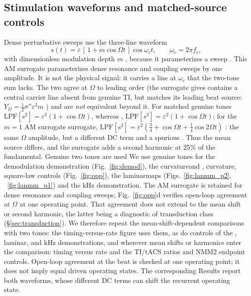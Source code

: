 \documentclass[11pt,a4paper]{article}
\newcommand{\Sig}{\sigma}
\newcommand{\half}{\tfrac{1}{2}}
\providecommand{\DIFaddtex}[1]{{\protect\color{blue} \sf #1}} %
\providecommand{\DIFdeltex}[1]{{\protect\color{red} \scriptsize #1}} %
\providecommand{\DIFaddbegin}{} %
\providecommand{\DIFaddend}{} %
\providecommand{\DIFdelbegin}{} %
\providecommand{\DIFdelend}{} %
\providecommand{\DIFadd}[1]{\texorpdfstring{\DIFaddtex{#1}}{#1}} %
\providecommand{\DIFdel}[1]{\texorpdfstring{\DIFdeltex{#1}}{}} %
\begin{document}
\DIFaddend \subsection{Stimulation waveforms and matched-source controls}\label{sec:waveforms}
Dense perturbative sweeps use the
three-line waveform
\begin{equation}
s(t)=\varepsilon\,[\,1+m\cos\Omega t\,]\cos\omega_c t,\qquad \omega_c=2\pi f_c ,
\label{eq:amsur}
\end{equation}
with dimensionless modulation depth $m$\DIFdelbegin \DIFdel{, because it parameterizes a sweep }\DIFdelend \DIFaddbegin \DIFadd{. This AM surrogate parameterizes dense
resonance and coupling sweeps }\DIFaddend by one amplitude. It \DIFdelbegin \DIFdel{is not
the physical signal: it carries a line at $\omega_c$ that the two-tone sum lacks. The two
agree at $\Omega$ to leading order (the surrogate gives
}\DIFdelend \DIFaddbegin \DIFadd{contains a central carrier
line absent from genuine TI, but matches its leading beat source:
}\DIFaddend $Y_\Omega=\half\Sig''\varepsilon^2m$\DIFdelbegin \DIFdel{) and are \emph{not} equivalent beyond it}\DIFdelend . For matched genuine tones\DIFdelbegin \DIFdel{$\mathrm{LPF}[s^2]=\varepsilon^2(1+\cos\Omega t)$,
whereas }\DIFdelend \DIFaddbegin \DIFadd{,
$\mathrm{LPF}[s^2]=\varepsilon^2(1+\cos\Omega t)$; }\DIFaddend for the $m=1$ \DIFdelbegin \DIFdel{AM surrogate}\DIFdelend \DIFaddbegin \DIFadd{surrogate,
}\DIFaddend $\mathrm{LPF}[s^2]=\varepsilon^2(\tfrac34+\cos\Omega t+\tfrac14\cos2\Omega t)$\DIFdelbegin \DIFdel{: the same
$\Omega$ amplitude, but a different DC term and a spurious }\DIFdelend \DIFaddbegin \DIFadd{.
Thus the mean source differs, and the surrogate adds a }\DIFaddend second harmonic at
$25\%$ of the fundamental. \DIFdelbegin \DIFdel{Genuine two tones are used }\DIFdelend \DIFaddbegin \DIFadd{We use genuine tones }\DIFaddend for the demodulation\DIFdelbegin \DIFdel{demonstration
(Fig.~\ref{fig:demod}),
the curvatureand }\DIFdelend \DIFaddbegin \DIFadd{,
curvature, }\DIFaddend square-law\DIFdelbegin \DIFdel{controls (Fig.~\ref{fig:opp}), the
laminarmaps (Figs.~\ref{fig:lanmm_p2}, ~\ref{fig:lanmm_p1}) and the kHz demonstration.
The AM surrogate is retained for dense resonance and coupling sweeps;
Fig.~\ref{fig:opp}d verifies open-loop agreement at $\Omega$ at one operating point.
That agreement does not extend to the mean shift or second harmonic, the latter
being a diagnostic of transduction class (\S\ref{sec:transduction}). We therefore
repeat the mean-shift-dependent comparisons with two tones: the timing-versus-rate
figure uses them, as do controls of the }\DIFdelend \DIFaddbegin \DIFadd{, laminar, and kHz demonstrations, and wherever mean shifts
or harmonics enter the comparison: timing versus rate and the }\DIFaddend TI/tACS \DIFdelbegin \DIFdel{ratios }\DIFdelend and
NMM2 endpoint \DIFaddbegin \DIFadd{controls. Open-loop agreement at the beat is checked at one
operating point; it does not imply equal driven operating states}\DIFaddend .
\DIFdelbegin \DIFdel{The corresponding Results report both waveforms, whose different DC terms can
shift the recurrent operating state.
}\DIFdelend
\end{document}
